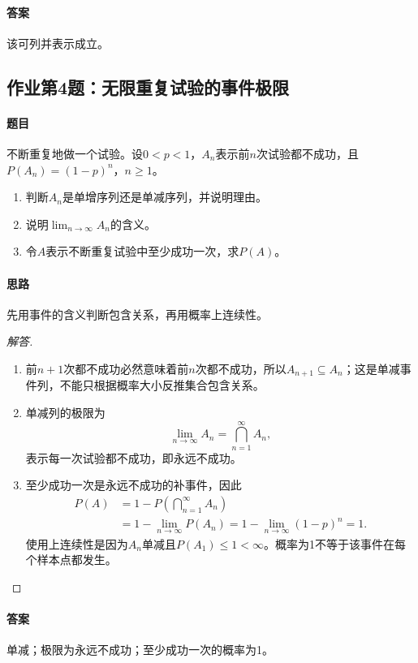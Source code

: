\paragraph{答案}该可列并表示成立。

\subsection{作业第4题：无限重复试验的事件极限}\label{ex:w02-h4}
\paragraph{题目}
不断重复地做一个试验。设$0<p<1$，$A_n$表示前$n$次试验都不成功，且$P(A_n)=(1-p)^n$，$n\geq1$。
\begin{enumerate}[label=(\arabic*)]
\item 判断$A_n$是单增序列还是单减序列，并说明理由。
\item 说明$\lim_{n\to\infty}A_n$的含义。
\item 令$A$表示不断重复试验中至少成功一次，求$P(A)$。
\end{enumerate}
\paragraph{思路}先用事件的含义判断包含关系，再用概率上连续性。
\begin{proof}[解答]
\begin{enumerate}[label=(\arabic*)]
\item 前$n+1$次都不成功必然意味着前$n$次都不成功，所以$A_{n+1}\subseteq A_n$；这是单减事件列，不能只根据概率大小反推集合包含关系。
\item 单减列的极限为
\[\lim_{n\to\infty}A_n=\bigcap_{n=1}^{\infty}A_n,\]
表示每一次试验都不成功，即永远不成功。
\item 至少成功一次是永远不成功的补事件，因此
\begin{align*}
P(A)&=1-P\left(\bigcap_{n=1}^{\infty}A_n\right)\\
&=1-\lim_{n\to\infty}P(A_n)=1-\lim_{n\to\infty}(1-p)^n=1.
\end{align*}
使用上连续性是因为$A_n$单减且$P(A_1)\leq1<\infty$。概率为1不等于该事件在每个样本点都发生。
\end{enumerate}
\end{proof}
\paragraph{答案}单减；极限为永远不成功；至少成功一次的概率为1。
